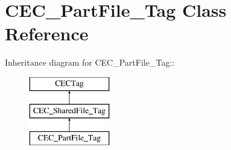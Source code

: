 \section{CEC\_\-PartFile\_\-Tag Class Reference}
\label{classCEC__PartFile__Tag}
Inheritance diagram for CEC\_\-PartFile\_\-Tag::\begin{figure}[H]
\begin{center}
\leavevmode
\includegraphics[height=3cm]{classCEC__PartFile__Tag}
\end{center}
\end{figure}
